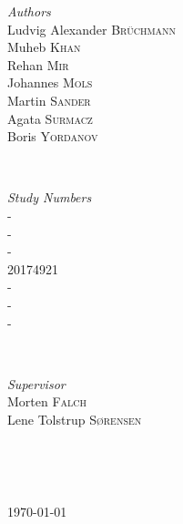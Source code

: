 \documentclass[12p]{article}
\begin{document}
\begin{titlepage}
	\begin{minipage}{0.4\textwidth}
    \begin{flushleft} \large
    \emph{Authors}\\
        Ludvig Alexander \textsc{Brüchmann} \\
        Muheb \textsc{Khan} \\
    	Rehan \textsc{Mir} \\
    	Johannes \textsc{Mols} \\
    	Martin \textsc{Sander} \\
    	Agata \textsc{Surmacz} \\
    	Boris \textsc{Yordanov} \\
    \end{flushleft}
    \end{minipage}
    ~
    \begin{minipage}{0.4\textwidth}
    \begin{flushright} \large
    \emph{Study Numbers} \\
        - \\
        - \\
        - \\
        20174921 \\
        - \\
        - \\
        - \\
    \end{flushright}
    \end{minipage}\\[0.5cm]
    
    
    \begin{minipage}{0.4\textwidth}
    \begin{flushleft} \large
    \emph{Supervisor}\\
        Morten \textsc{Falch} \\
        Lene Tolstrup \textsc{Sørensen} \\
    \end{flushleft}
    \end{minipage}
    ~
    \begin{minipage}{0.4\textwidth}
    \begin{flushright} \large
    \end{flushright}
    \end{minipage}\\[0.5cm]

	
	\vfill\vfill\vfill %
	
	{\large\today} %
	
    
\end{titlepage}
\end{document}
